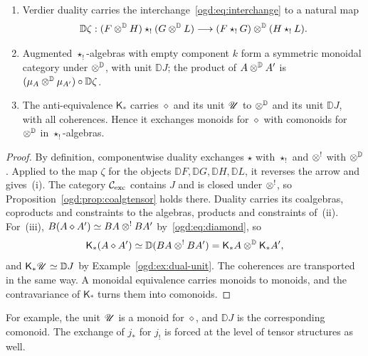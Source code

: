 \begin{proposition}\label{ogd:prop:dual-tensor}
\begin{enumerate}
\item Verdier duality carries the interchange~\eqref{ogd:eq:interchange} to a natural map
\[
 \mathbb D\zeta:(F\mathbin{\otimes^{\mathbb D}} H)\star_!(G\mathbin{\otimes^{\mathbb D}} L)\longrightarrow(F\star_!G)\mathbin{\otimes^{\mathbb D}}(H\star_!L).
\]
\item Augmented \(\star_!\)-algebras with empty component \(k\) form a symmetric monoidal category under \(\mathbin{\otimes^{\mathbb D}}\), with unit \(\mathbb DJ\); the product of \(A\mathbin{\otimes^{\mathbb D}} A'\) is \((\mu_A\mathbin{\otimes^{\mathbb D}}\mu_{A'})\circ\mathbb D\zeta\).
\item The anti-equivalence \(\mathsf K_*\) carries \(\diamond\) and its unit \(\mathscr U\) to \(\mathbin{\otimes^{\mathbb D}}\) and its unit \(\mathbb DJ\), with all coherences.
Hence it exchanges monoids for \(\diamond\) with comonoids for \(\mathbin{\otimes^{\mathbb D}}\) in \(\star_!\)-algebras.
\end{enumerate}
\end{proposition}
\begin{proof}
By definition, componentwise duality exchanges \(\star\) with \(\star_!\) and \(\mathbin{\otimes^!}\) with \(\mathbin{\otimes^{\mathbb D}}\).
Applied to the map \(\zeta\) for the objects \(\mathbb DF,\mathbb DG,\mathbb DH,\mathbb DL\), it reverses the arrow and gives~(i).
The category \(\mathcal C_{\mathrm{exc}}\) contains \(J\) and is closed under \(\mathbin{\otimes^!}\), so Proposition~\ref{ogd:prop:coalgtensor} holds there.
Duality carries its coalgebras, coproducts and constraints to the algebras, products and constraints of~(ii).
For~(iii), \(B(A\diamond A')\simeq BA\mathbin{\otimes^!} BA'\) by~\eqref{ogd:eq:diamond}, so
\[
 \mathsf K_*(A\diamond A')\simeq\mathbb D(BA\mathbin{\otimes^!} BA')=\mathsf K_*A\mathbin{\otimes^{\mathbb D}}\mathsf K_*A',
\]
and \(\mathsf K_*\mathscr U\simeq\mathbb DJ\) by Example~\ref{ogd:ex:dual-unit}.
The coherences are transported in the same way.
A monoidal equivalence carries monoids to monoids, and the contravariance of \(\mathsf K_*\) turns them into comonoids.
\end{proof}

For\label{ogd:def:dual-unit-monoid-comonoid} example, the unit \(\mathscr U\) is a monoid for \(\diamond\), and \(\mathbb DJ\) is the corresponding comonoid.
The exchange of \(j_*\) for \(j_!\) is forced at the level of tensor structures as well.

